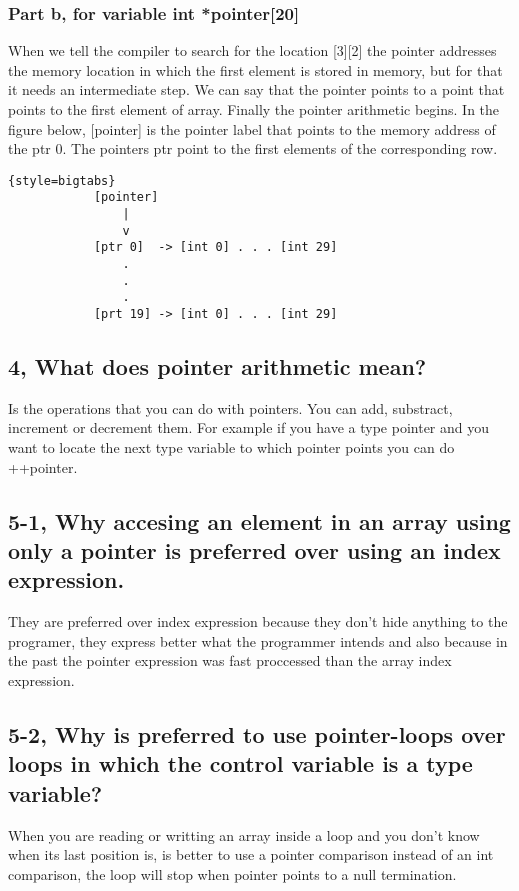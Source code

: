 \documentclass[11pt]{article}
\begin{document}
\subsubsection*{Part b, for variable int *pointer[20]}
When we tell the compiler to search for the location [3][2] the pointer addresses the memory location in which the first element is stored in memory, but for that it needs an intermediate step.
We can say that the pointer points to a point that points to the first element of array.
Finally the pointer arithmetic begins.
In the figure below, [pointer] is the pointer label that points to the memory address of the ptr 0.
The pointers ptr point to the first elements of the corresponding row.

\begin{lstlisting}{style=bigtabs}
			[pointer]
			    |
			    v    
			[ptr 0]  -> [int 0] . . . [int 29]
			    .
			    .
			    .
			[prt 19] -> [int 0] . . . [int 29]
\end{lstlisting}
	    
\subsection*{4, What does pointer arithmetic mean?}
Is the operations that you can do with pointers. You can add, substract, increment or decrement them.
For example if you have a type pointer and you want to locate the next type variable to which pointer points you can do ++pointer.

\subsection*{5-1, Why accesing an element in an array using only a pointer is preferred over using an index expression.}
They are preferred over index expression because they don't hide anything to the programer, they express better what the programmer intends and also because in the past the pointer expression was fast proccessed than the array index expression.

\subsection*{5-2, Why is preferred to use pointer-loops over loops in which the control variable is a type variable?}
When you are reading or writting an array inside a loop and you don't know when its last position is, is better to use a pointer comparison instead of an int comparison, the loop will stop when pointer points to a null termination.
\end{document}

